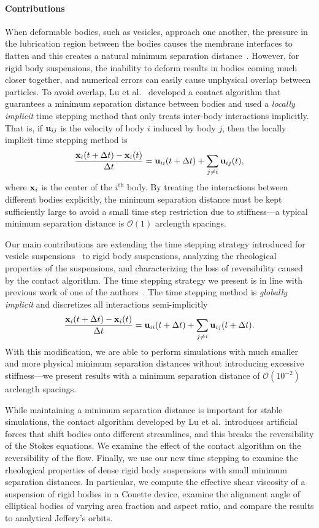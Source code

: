 \documentclass[AMA,STIX1COL]{WileyNJD-v2}
\begin{document}
\paragraph{Contributions} When deformable bodies, such as vesicles, approach
one another, the pressure in the lubrication region between the bodies
causes the membrane interfaces to flatten and this creates a natural
minimum separation distance~\cite{lac-mor-bar2007}.  However, for rigid
body suspensions, the inability to deform results in bodies coming much
closer together, and numerical errors can easily cause unphysical
overlap between particles.  To avoid overlap, Lu et al.~\cite{Lu2017}
developed a contact algorithm that guarantees a minimum separation
distance between bodies and used a {\em locally implicit} time stepping
method that only treats inter-body interactions implicitly.  That is, if
${\mathbf{u}}_{ij}$ is the velocity of body $i$ induced by body $j$, then the
locally implicit time stepping method is
\begin{align*}
  \frac{{\mathbf{x}}_i(t + \Delta t) -  {\mathbf{x}}_i(t)}{\Delta t} = 
    {\mathbf{u}}_{ii}(t+\Delta t) + \sum_{j \neq i} {\mathbf{u}}_{ij}(t),
\end{align*}
where ${\mathbf{x}}_i$ is the center of the $i^{\mathrm{th}}$ body.  By treating
the interactions between different bodies explicitly, the minimum
separation distance must be kept sufficiently large to avoid a small
time step restriction due to stiffness---a typical minimum separation
distance is $\mathcal{O}(1)$ arclength spacings.

Our main contributions are extending the time stepping strategy
introduced for vesicle suspensions~\cite{Quaife2014} to rigid body
suspensions, analyzing the rheological properties of the suspensions,
and characterizing the loss of reversibility caused by the contact
algorithm.  The time stepping strategy we present is in line with
previous work of one of the authors~\cite{Quaife2014}.  The time
stepping method is {\em globally implicit} and discretizes all
interactions semi-implicitly
\begin{align*}
  \frac{{\mathbf{x}}_i(t + \Delta t) -  {\mathbf{x}}_i(t)}{\Delta t} = 
    {\mathbf{u}}_{ii}(t+\Delta t) + \sum_{j \neq i} {\mathbf{u}}_{ij}(t+\Delta t).
\end{align*}
With this modification, we are able to perform simulations with much
smaller and more physical minimum separation distances without
introducing excessive stiffness---we present results with a minimum
separation distance of $\mathcal{O}(10^{-2})$ arclength spacings.

While maintaining a minimum separation distance is important for stable
simulations, the contact algorithm developed by Lu et al.~introduces
artificial forces that shift bodies onto different streamlines, and this
breaks the reversibility of the Stokes equations.  We examine the effect
of the contact algorithm on the reversibility of the flow.  Finally, we
use our new time stepping to examine the rheological properties of dense
rigid body suspensions with small minimum separation distances.  In
particular, we compute the effective shear viscosity of a suspension of
rigid bodies in a Couette device, examine the alignment angle of
elliptical bodies of varying area fraction and aspect ratio, and compare
the results to analytical Jeffery's orbits.
\end{document}

